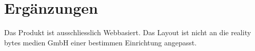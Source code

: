 \section{Ergänzungen}

    Das Produkt ist ausschliesslich Webbasiert. Das Layout ist nicht an die reality bytes medien GmbH einer bestimmen Einrichtung angepasst.